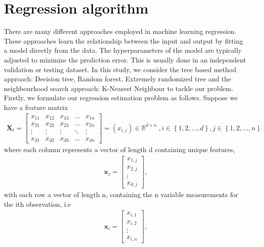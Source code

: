 \section{Regression algorithm} 
\label{algo1}
There are many different approaches employed in machine learning regression. These approaches learn the relationship between the input and output by fitting a model directly from the data. The hyperparameters of the model are typically adjusted to minimize the prediction error. This is usually done  in an independent validation or testing dataset. In this study, we consider the tree based method approach: Decision tree, Random forest, Extremely randomized tree and the neighbourhood search approach: K-Nearest Neighbour to tackle our problem. Firstly, we formulate our regression estimation problem as follows. Suppose we have a feature matrix 
\begin{align*}
\textbf{X}_{t}=\begin{bmatrix}
    x_{11} & x_{12} & x_{13} & \dots  & x_{1n} \\
    x_{21} & x_{22} & x_{23} & \dots  & x_{2n} \\
    \vdots & \vdots & \vdots & \ddots & \vdots \\
    x_{d1} & x_{d2} & x_{d3} & \dots  & x_{dn}
\end{bmatrix}=(x_{i,j}) \in  \mathbb{R}^{d \times n}\;, i\in \left\{1,2,\dots, d\right\}, j \in \left\{1,2,\dots,n\right\}
\end{align*}
where each column represents a vector of length d containing unique features, 
\begin{align*}
\textbf{x}_j=\begin{bmatrix}
    x_{1,j}  \\
    x_{2,j} \\
    \vdots \\
    x_{d,j} 
\end{bmatrix},
\end{align*}
with each row a vector of length n, containing the n variable measurements for the ith observation, i.e 
\begin{align*}
\textbf{x}_i=\begin{bmatrix}
    x_{i,1}  \\
    x_{i,2} \\
    \vdots \\
    x_{i,n} 
\end{bmatrix},
\end{align*}

